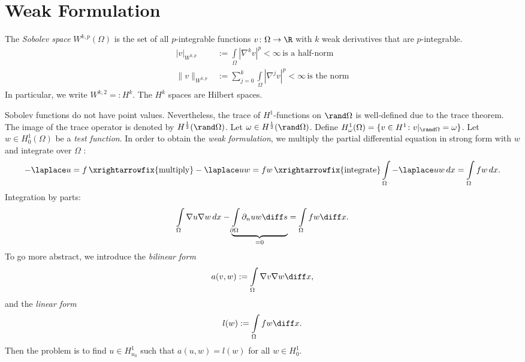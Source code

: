 \section{Weak Formulation}
\begin{definition}
The \textit{Sobolev space} $W^{k,p}(\Omega)$ is the set of all $p$-integrable functions $v\colon\Omega\to\R$ with $k$ weak derivatives that are $p$-integrable.
\begin{align*}
  |v|_{W^{k,p}} &:= \int\limits_\Omega|\nabla^kv|^p<\infty\,\text{is a half-norm} \\
  \|v\|_{W^{k,p}} &:= \sum_{j=0}^k \int\limits_\Omega |\nabla^jv|^p < \infty\, \text{is the norm}
\end{align*}
In particular, we write $W^{k,2}=: H^k$. The $H^k$ spaces are Hilbert spaces.
\end{definition}
Sobolev functions do not have point values. Nevertheless, the trace of $H^1$-functions on $\boundary\Omega$ is well-defined due to the trace theorem. The image of the trace operator is denoted by $H^{\frac{1}{2}}(\boundary\Omega)$. Let $\omega\in H^{\frac{1}{2}}(\boundary\Omega)$. Define $H_\omega^1(\Omega)=\{ v\in H^1\colon v|_{\boundary\Omega}=\omega\}$. Let $w\in H_0^1(\Omega)$ be a \textit{test function}. In order to obtain the \textit{weak formulation}, we multiply the partial differential equation in strong form with $w$ and integrate over $\Omega$ :
\begin{equation*}
    -\laplace u=f\, \xrightarrowfix{\text{multiply}}-\laplace uw=fw\,\xrightarrowfix{\text{integrate}}\int\limits_\Omega-\laplace uw\,dx=\int\limits_\Omega fw\,dx.
\end{equation*}
Integration by parts:
\begin{equation*}
    \int\limits_\Omega\nabla u\nabla w\,dx-\underbrace{\int\limits_{\partial\Omega}\partial_{n}uw \diff s}_{=0}=\int\limits_\Omega fw\diff x.
\end{equation*}
To go more abstract, we introduce the \textit{bilinear form}
\begin{equation*}
    a(v,w):=\int\limits_\Omega\nabla v\nabla w\diff x,
\end{equation*}
and the \textit{linear form}
\begin{equation*}
    l(w):=\int\limits_\Omega fw\diff x.
\end{equation*}
Then the problem is to find $u\in H_{u_0}^1$ such that $a(u,w)=l(w)$ for all $w\in H_0^1$.
